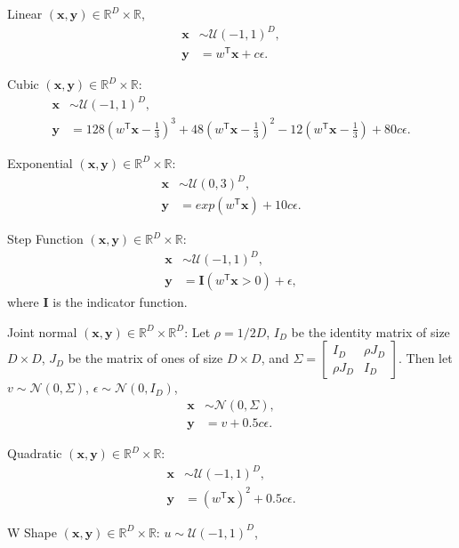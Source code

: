 \documentclass[11pt]{article}
\providecommand{\mb}[1]{\boldsymbol{#1}}
\providecommand{\mc}[1]{\mathcal{#1}}
\newcommand{\Real}{\mathbb{R}}
\newcommand{\T}{^{\ensuremath{\mathsf{T}}}}           %
\newcommand{\mbx}{\ensuremath{\mb{x}}}
\newcommand{\mby}{\ensuremath{\mb{y}}}
\begin{document}
\setcounter{equation}{0}
\begin{compactenum}
\item Linear $(\mbx,\mby) \in \Real^{D} \times \Real$,
\begin{align*}
\mbx &\sim \mc{U}(-1,1)^{D},\\
\mby &=w\T \mbx+c\epsilon.
\end{align*}
\item Cubic $(\mbx,\mby) \in \Real^{D} \times \Real$:
\begin{align*}
\mbx &\sim \mc{U}(-1,1)^{D}, \\
\mby &=128(w\T \mbx-\tfrac{1}{3})^3+48(w\T \mbx-\tfrac{1}{3})^2-12(w\T \mbx-\tfrac{1}{3})+80c\epsilon.
\end{align*}
\item Exponential $(\mbx,\mby) \in \Real^{D} \times \Real$:
\begin{align*}
\mbx &\sim \mc{U}(0,3)^{D}, \\
\mby &=exp(w\T \mbx)+10c\epsilon.
\end{align*}
\item Step Function $(\mbx,\mby) \in \Real^{D} \times \Real$:
\begin{align*}
\mbx &\sim \mc{U}(-1,1)^{D},\\
\mby &=\mb{I}(w\T \mbx>0)+\epsilon,
\end{align*}
where $\mb{I}$ is the indicator function.
\item Joint normal $(\mbx,\mby) \in \Real^{D} \times \Real^{D}$: Let $\rho=1/2D$, $I_{D}$ be the identity matrix of size $D \times D$, $J_{D}$ be the matrix of ones of size $D \times D$, and $\Sigma = \begin{bmatrix} I_{D}&\rho J_{D}\\ \rho J_{D}&I_{D} \end{bmatrix}$. Then let $v \sim \mc{N}(0, \Sigma)$, $\epsilon \sim \mc{N}(0, I_{D})$,
\begin{align*}
\mbx &\sim \mc{N}(0, \Sigma),\\
\mby &=v+0.5c\epsilon.
\end{align*}
\item Quadratic $(\mbx,\mby) \in \Real^{D} \times \Real$:
\begin{align*}
\mbx &\sim \mc{U}(-1,1)^{D},\\
\mby&=(w\T \mbx)^2+0.5c\epsilon.
\end{align*}
\item W Shape $(\mbx,\mby) \in \Real^{D} \times \Real$:  $u \sim \mc{U}(-1,1)^{D}$,
\begin{align*}

\end{align*}
\end{compactenum}
\end{document}
